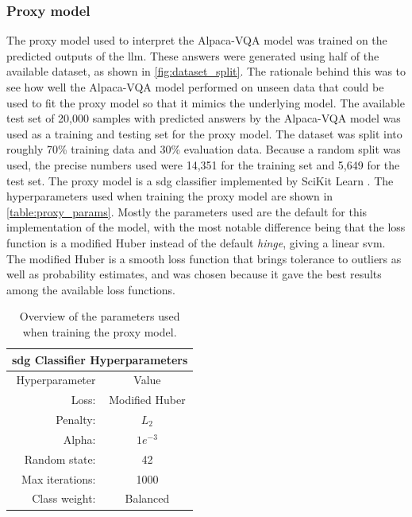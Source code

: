    \subsubsection{Proxy model}
    The proxy model used to interpret the Alpaca-VQA model was trained on the predicted outputs of the \gls{llm}. These answers were generated using half of the available dataset, as shown in \autoref{fig:dataset_split}. The rationale behind this was to see how well the Alpaca-VQA model performed on unseen data that could be used to fit the proxy model so that it mimics the underlying model. 
    The available test set of 20,000 samples with predicted answers by the Alpaca-VQA model was used as a training and testing set for the proxy model. The dataset was split into roughly 70\% training data and 30\% evaluation data. Because a random split was used, the precise numbers used were 14,351 for the training set and 5,649 for the test set.
    The proxy model is a \gls{sdg} classifier implemented by SciKit Learn \cite{SklearnLinearModel}.
    The hyperparameters used when training the proxy model are shown in \autoref{table:proxy_params}. Mostly the parameters used are the default for this implementation of the model, with the most notable difference being that the loss function is a modified Huber instead of the default \textit{hinge}, giving a linear \gls{svm}. 
    The modified Huber is a smooth loss function that brings tolerance to
    outliers as well as probability estimates, and was chosen because it gave the best results among the available loss functions.
    

    \begin{table}[htb]
    \centering
    \begin{tabular}{ r c } 
        \multicolumn{2}{c}{\textbf{\gls{sdg} Classifier Hyperparameters}}\\ 
        \toprule
           Hyperparameter & Value \\
        \midrule
            Loss: & Modified Huber\\
            Penalty: & $L_2$\\
            Alpha: & $1e^{-3}$\\
            Random state: & 42\\
            Max iterations: & 1000\\
            Class weight: & Balanced\\[0.5ex]
        \bottomrule
    \end{tabular}
    \caption{Overview of the parameters used when training the proxy model.}
    \label{table:proxy_params}
    \end{table}
    

